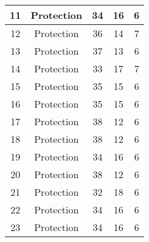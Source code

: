 \documentclass[results.tex]{subfiles}
\begin{document}
\begin{center}
\begin{tabular}{| c || c | c | c | c |}
            \hline
            11                      & Protection                   & 34                     & 16                      & 6                    \\
            \hline
            12                      & Protection                   & 36                     & 14                      & 7                    \\
            \hline
            13                      & Protection                   & 37                     & 13                      & 6                    \\
            \hline
            14                      & Protection                   & 33                     & 17                      & 7                    \\
            \hline
            15                      & Protection                   & 35                     & 15                      & 6                    \\
            \hline
            16                      & Protection                   & 35                     & 15                      & 6                    \\
            \hline
            17                      & Protection                   & 38                     & 12                      & 6                    \\
            \hline
            18                      & Protection                   & 38                     & 12                      & 6                    \\
            \hline
            19                      & Protection                   & 34                     & 16                      & 6                    \\
            \hline
            20                      & Protection                   & 38                     & 12                      & 6                    \\
            \hline
            21                      & Protection                   & 32                     & 18                      & 6                    \\
            \hline
            22                      & Protection                   & 34                     & 16                      & 6                    \\
            \hline
            23                      & Protection                   & 34                     & 16                      & 6                    \\

\end{tabular}
\end{center}
\end{document}
